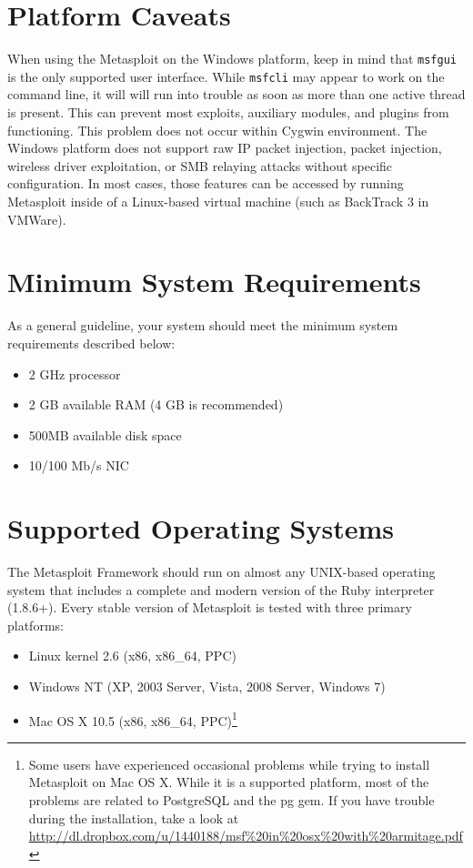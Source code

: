\documentclass{report}
\begin{document}
    \section{Platform Caveats}
    \label{INSTALL-CAVEAT}

\par
When using the Metasploit on the Windows platform, keep in mind that
\texttt{msfgui} is the only supported user interface. While \texttt{msfcli} may
appear to work on the command line, it will will run into trouble as soon as
more than one active thread is present. This can prevent most exploits,
auxiliary modules, and plugins from functioning. This problem does not occur
within Cygwin environment. The Windows platform does not support raw IP packet
injection, packet injection, wireless driver exploitation, or SMB relaying
attacks without specific configuration. In most cases, those features can be
accessed by running Metasploit inside of a Linux-based virtual machine (such as
BackTrack 3 in VMWare).

    \section{Minimum System Requirements}
    \label{INSTALL-REQUIRE}

\par
As a general guideline, your system should meet the minimum system requirements
described below:

\begin{itemize}
\item 2 GHz processor
\item 2 GB available RAM (4 GB is recommended)
\item 500MB available disk space
\item 10/100 Mb/s NIC
\end{itemize}

    \section{Supported Operating Systems}
    \label{INSTALL-SUPPORT}

\par
The Metasploit Framework should run on almost any UNIX-based operating system
that includes a complete and modern version of the Ruby interpreter (1.8.6+).
Every stable version of Metasploit is tested with three primary platforms:

\begin{itemize}
\item Linux kernel 2.6 (x86, x86\_64, PPC)
\item Windows NT (XP, 2003 Server, Vista, 2008 Server, Windows 7)
\item Mac OS X 10.5 (x86, x86\_64, PPC)\footnote{Some users have experienced
      occasional problems while trying to install Metasploit on Mac OS X.
      While it is a supported platform, most of the problems are related to
      PostgreSQL and the pg gem. If you have trouble during the installation,
      take a look at
      \url{http://dl.dropbox.com/u/1440188/msf\%20in\%20osx\%20with\%20armitage.pdf}}
\end{itemize}
\end{document}
